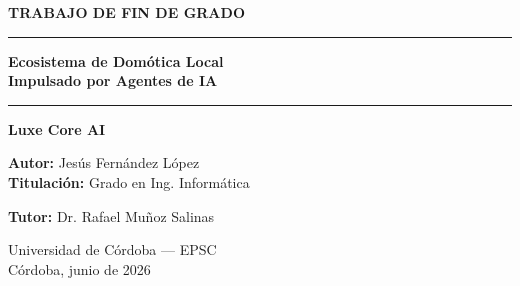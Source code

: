 {\begin{frame}[plain]
{\begin{center}
    {\normalsize\bfseries\color{primary}TRABAJO DE FIN DE GRADO}

    \vspace{0.15cm}
    \rule{0.45\textwidth}{0.5pt}

    \vspace{0.15cm}
    {\LARGE\bfseries\color{primary}
     Ecosistema de Domótica Local\\[0.06cm]
     Impulsado por Agentes de IA}

    \vspace{0.15cm}
    \rule{0.45\textwidth}{0.5pt}

    \vspace{0.15cm}
    {\large\color{secondary}\bfseries Luxe Core AI}

    \vfill

    \begin{minipage}{0.45\textwidth}
      \begin{flushleft}
        {\footnotesize\bfseries Autor:} {\normalsize Jesús Fernández López}\\[0.15cm]
        {\footnotesize\bfseries Titulación:} {\footnotesize Grado en Ing. Informática}
      \end{flushleft}
    \end{minipage}
    \hfill
    \begin{minipage}{0.45\textwidth}
      \begin{flushright}
        {\footnotesize\bfseries Tutor:} {\normalsize Dr. Rafael Muñoz Salinas}
      \end{flushright}
    \end{minipage}

    \vfill

    \makebox[3cm]{\hrulefill}

    \vspace{0.15cm}
    {\footnotesize\color{darkgray}Universidad de Córdoba — EPSC}\\[0.06cm]
    {\footnotesize\color{darkgray}Córdoba, junio de 2026}

    \vspace*{0.22cm}
  \end{center}}

\end{frame}
}
